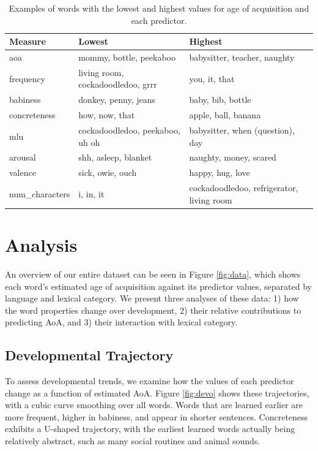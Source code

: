 \documentclass[10pt, letterpaper]{article}
\begin{document}
\begin{table}[!hb]
\centering
\begin{tabular}{lll}
  \hline
Measure & Lowest & Highest \\ 
  \hline
aoa & mommy, bottle, peekaboo & babysitter, teacher, naughty \\ 
  frequency & living room, cockadoodledoo, grrr & you, it, that \\ 
  babiness & donkey, penny, jeans & baby, bib, bottle \\ 
  concreteness & how, now, that & apple, ball, banana \\ 
  mlu & cockadoodledoo, peekaboo, uh oh & babysitter, when (question), day \\ 
  arousal & shh, asleep, blanket & naughty, money, scared \\ 
  valence & sick, owie, ouch & happy, hug, love \\ 
  num\_characters & i, in, it & cockadoodledoo, refrigerator, living room \\ 
   \hline
\end{tabular}
\caption{Examples of words with the lowest and highest values for age of acquisition and each predictor.} 
\end{table}

\newpage

\section{Analysis}\label{analysis}

An overview of our entire dataset can be seen in Figure \ref{fig:data},
which shows each word's estimated age of acquisition against its
predictor values, separated by language and lexical category. We present
three analyses of these data: 1) how the word properties change over
development, 2) their relative contributions to predicting AoA, and 3)
their interaction with lexical category.

\subsection{Developmental Trajectory}\label{developmental-trajectory}

To assess developmental trends, we examine how the values of each
predictor change as a function of estimated AoA. Figure \ref{fig:devo}
shows these trajectories, with a cubic curve smoothing over all words.
Words that are learned earlier are more frequent, higher in babiness,
and appear in shorter sentences. Concreteness exhibits a U-shaped
trajectory, with the earliest learned words actually being relatively
abstract, such as many social routines and animal sounds.
\end{document}
